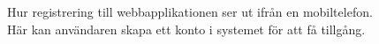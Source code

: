 \documentclass[a4paper,12pt]{article}
\begin{document}
 \begin{figure}[H]
   \centering
   \caption{Hur registrering till webbapplikationen ser ut ifrån en mobiltelefon. Här kan användaren skapa ett konto i systemet för att få tillgång.}
   \label{fig:mob_sign_up}
 \end{figure}
\end{document}
